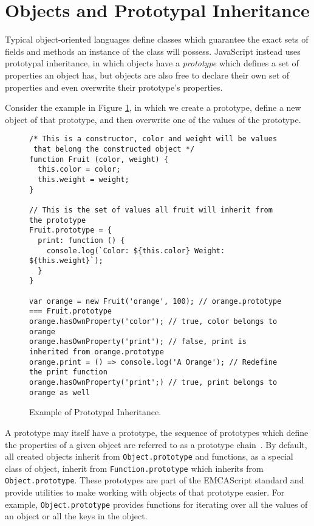 \documentclass[]{final_report}
\begin{document}
\section{Objects and Prototypal Inheritance}
Typical object-oriented languages define classes which guarantee the exact sets of fields and methods an instance of the class will possess. JavaScript instead uses prototypal inheritance, in which objects have a \textit{prototype} which defines a set of properties an object has, but objects are also free to declare their own set of properties and even overwrite their prototype's properties. 

Consider the example in Figure \ref{fig:js-prototypical-inheritance}, in which we create a prototype, define a new object of that prototype, and then overwrite one of the values of the prototype.

\begin{figure}[t]
\begin{lstlisting}
/* This is a constructor, color and weight will be values
 that belong the constructed object */
function Fruit (color, weight) {
  this.color = color;
  this.weight = weight;
}

// This is the set of values all fruit will inherit from the prototype
Fruit.prototype = {
  print: function () {
    console.log(`Color: ${this.color} Weight: ${this.weight}`);
  }
}

var orange = new Fruit('orange', 100); // orange.prototype === Fruit.prototype
orange.hasOwnProperty('color'); // true, color belongs to orange
orange.hasOwnProperty('print'); // false, print is inherited from orange.prototype
orange.print = () => console.log('A Orange'); // Redefine the print function
orange.hasOwnProperty('print';) // true, print belongs to orange as well
\end{lstlisting}
\caption{\label{fig:js-prototypical-inheritance} Example of Prototypal Inheritance.}
\end{figure} 

A prototype may itself have a prototype, the sequence of prototypes which define the properties of a given object are referred to as a prototype chain~\cite{EcmaScript, borning1986classes}. By default, all created objects inherit from \lstinline{Object.prototype} and functions, as a special class of object, inherit from \lstinline{Function.prototype} which inherits from \lstinline{Object.prototype}. These prototypes are part of the EMCAScript standard and provide utilities to make working with objects of that prototype easier. For example, \lstinline{Object.prototype} provides functions for iterating over all the values of an object or all the keys in the object.
\end{document}
